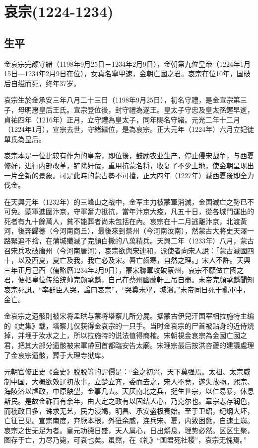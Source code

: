 
\section{哀宗\tiny(1224-1234)}

\subsection{生平}

金哀宗完颜守緒（1198年9月25日－1234年2月9日），金朝第九位皇帝（1224年1月15日—1234年2月9日在位），女真名寧甲速，金朝亡國之君。哀宗在位10年，国破后自缢而死，终年37岁。

哀宗生於金承安三年八月二十三日（1198年9月25日），初名守禮，是金宣宗第三子，母明惠皇后王氏。宣宗登位後，封守禮為遂王。皇太子守忠及皇太孫鏗早逝，貞祐四年（1216年）正月，立守禮為皇太子，同年賜名守緒。元光二年十二月（1224年1月），宣宗去世，守緒繼位，是為哀宗。正大元年（1224年）六月立妃徒單氏為皇后。

哀宗本是一位比较有作为的皇帝，即位後，鼓励农业生产，停止侵宋战争，与西夏修好，进行内部改革，铲除奸佞，重用抗蒙名将，收复了不少土地，使金朝呈现出一片全新的景象。可是此時的蒙古勢不可擋，正大四年（1227年）滅西夏後即全力伐金。

在天興元年（1232年）的三峰山之战中，金军主力被蒙軍消滅，金国滅亡之勢已不可免。蒙軍進圍汴京，守軍奮力抵抗，當年汴京大疫，凡五十日，從各城門運出的死者有九十餘萬人，貧不能葬者尚未包括在內。哀宗在十二月逃離汴京，北渡黃河，後奔歸德（今河南商丘），最後來到蔡州（今河南汝南），然蒙古大將史天澤一路緊追不捨，在蒲城殲滅了完顏白撒的八萬精兵。天興二年（1233年）八月，蒙古召宋兵攻破唐州（今河南唐河），哀宗欲與宋連和，派使者向宋人說：「蒙古滅國四十，以及西夏，夏亡及我，我亡必及宋。唇亡齒寒，自然之理。」宋人不許。天興三年正月己酉（儒略曆1234年2月9日），蒙宋聯軍攻破蔡州，哀宗不願做亡國之君，便把皇位传给统帅完颜承麟，自己在蔡州幽蘭軒上吊自盡。末帝完顏承麟聞知哀宗死訊，“率群臣入哭，諡曰哀宗”，“哭奠未畢，城潰。”末帝同日死于亂軍中，金亡。

金哀宗之遗骸則被宋将孟珙与蒙将塔察儿所分屍。据蒙古伊兒汗国宰相拉施特主编的《史集》载，塔察儿仅获得金哀宗的一只手。当时金哀宗的尸首被贴身的近侍烧掉，并埋于汝水之上，所以拉施特的说法值得商榷。宋朝視金哀宗為金國亡國之君，把其大部分遗骸被宋軍帶回首都臨安告太廟。宋理宗最后按洪咨夔的建議處理了金哀宗遗骸，葬于大理寺狱库。

元朝官修正史《金史》脱脱等的評價是：“金之初兴，天下莫强焉。太祖、太宗威制中国，大概欲效辽初故事，立楚立齐，委而去之，宋人不竞，遂失故物。熙宗、海陵济以虐政，中原觖望，金事几去。天厌南北之兵，挺生世宗，以仁易暴，休息斯民。是故金祚百有余年，由大定之政有以固结人心，乃克尔也。章宗志存润色，而秕政日多，诛求无艺，民力浸竭，明昌、承安盛极衰始。至于卫绍，纪纲大坏，亡征已见。宣宗南度，弃厥本根，外狃余威，连兵宋、夏，内致困惫，自速土崩。哀宗之世无足为者。皇元功德日盛，天人属心，日出爝息，理势必然。区区生聚，图存于亡，力尽乃毙，可哀也矣。虽然，在《礼》“国君死社稷”，哀宗无愧焉。”

